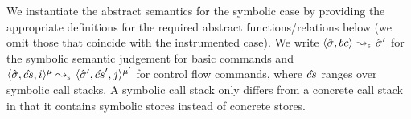 We instantiate the abstract semantics for the symbolic case by providing the appropriate definitions 
for the required abstract functions/relations below (we omit those that coincide with the instrumented case). 
We write $\absbsemrule{\sstate, \bcmd}{\sstate'}{\symbolic}$ for the symbolic semantic 
judgement for basic commands and $\abssemrule{\sstate, \scs, i}{\sstate', \scs', j}{\mode}{\mode'}{\symbolic}$ 
for control flow commands, where $\hat{cs}$ ranges over symbolic call stacks. 
A symbolic call stack only differs from a concrete call stack in that it contains 
symbolic stores instead of concrete stores.




